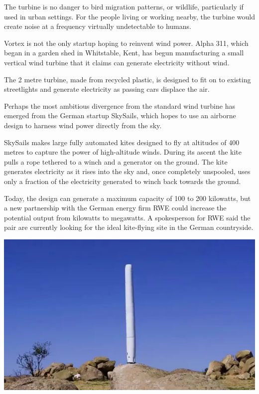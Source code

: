 \documentclass[
]{book}
\begin{document}
The turbine is no danger to bird migration patterns, or wildlife, particularly if used in urban settings. For the people living or working nearby, the turbine would create noise at a frequency virtually undetectable to humans.

Vortex is not the only startup hoping to reinvent wind power. Alpha 311, which began in a garden shed in Whitstable, Kent, has begun manufacturing a small vertical wind turbine that it claims can generate electricity without wind.

The 2 metre turbine, made from recycled plastic, is designed to fit on to existing streetlights and generate electricity as passing cars displace the air.

Perhaps the most ambitious divergence from the standard wind turbine has emerged from the German startup SkySails, which hopes to use an airborne design to harness wind power directly from the sky.

SkySails makes large fully automated kites designed to fly at altitudes of 400 metres to capture the power of high-altitude winds. During its ascent the kite pulls a rope tethered to a winch and a generator on the ground. The kite generates electricity as it rises into the sky and, once completely unspooled, uses only a fraction of the electricity generated to winch back towards the ground.

Today, the design can generate a maximum capacity of 100 to 200 kilowatts, but a new partnership with the German energy firm RWE could increase the potential output from kilowatts to megawatts. A spokesperson for RWE said the pair are currently looking for the ideal kite-flying site in the German countryside.

\includegraphics{fig/vortex_bladeless_3meter.png}
\end{document}
